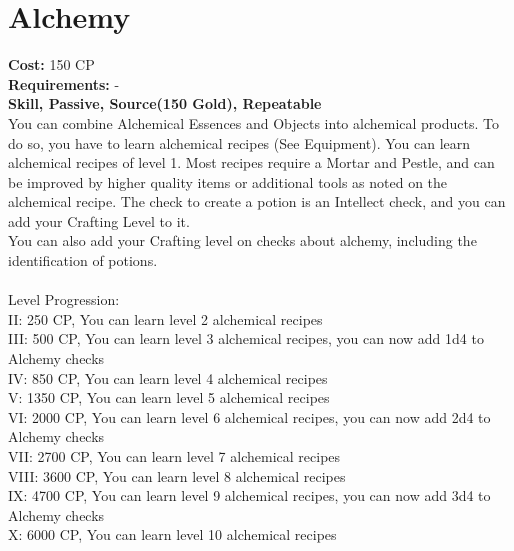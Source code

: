 \section{Alchemy}\label{perk:alchemy}
\textbf{Cost:} 150 CP\\
\textbf{Requirements:} -\\
\textbf{Skill, Passive, Source(150 Gold), Repeatable}\\
You can combine Alchemical Essences and Objects into alchemical products.
To do so, you have to learn alchemical recipes (See Equipment).
You can learn alchemical recipes of level 1.
Most recipes require a Mortar and Pestle, and can be improved by higher quality items or additional tools as noted on the alchemical recipe.
The check to create a potion is an Intellect check, and you can add your Crafting Level to it.\\
You can also add your Crafting level on checks about alchemy, including the identification of potions.\\
\\
Level Progression:\\
II: 250 CP, You can learn level 2 alchemical recipes\\
III: 500 CP, You can learn level 3 alchemical recipes, you can now add 1d4 to Alchemy checks\\
IV: 850 CP, You can learn level 4 alchemical recipes\\
V: 1350 CP, You can learn level 5 alchemical recipes\\
VI: 2000 CP, You can learn level 6 alchemical recipes, you can now add 2d4 to Alchemy checks\\
VII: 2700 CP, You can learn level 7 alchemical recipes\\
VIII: 3600 CP, You can learn level 8 alchemical recipes\\
IX: 4700 CP, You can learn level 9 alchemical recipes, you can now add 3d4 to Alchemy checks\\
X: 6000 CP, You can learn level 10 alchemical recipes\\